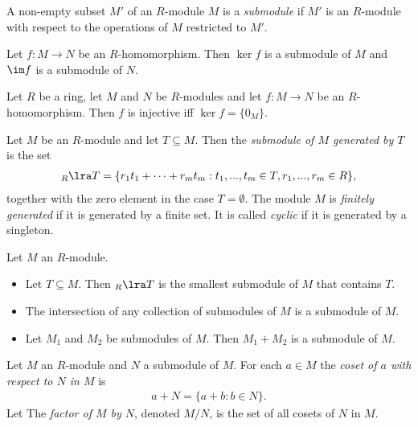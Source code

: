 \documentclass{article}
\begin{document}
\begin{definition}
    A non-empty subset $M'$ of an $R$-module $M$ is a \emph{submodule} if $M'$ is an 
    $R$-module with respect to the operations of $M$ restricted to $M'$.
\end{definition}

\begin{lemma}[Notes 3.7.21]
    Let $f:M\to N$ be an $R$-homomorphism. Then $\ker f$ is a submodule of $M$ and $\im f$
    is a submodule of $N$.
\end{lemma}

\begin{lemma}[Notes 3.7.22]
    Let $R$ be a ring, let $M$ and $N$ be $R$-modules and let $f:M\to N$ be an $R$-homomorphism.
    Then $f$ is injective iff $\ker f =\{0_M\}$. 
\end{lemma}

\begin{definition}
    Let $M$ be an $R$-module and let $T\subseteq M$. Then the \emph{submodule of $M$ generated by $T$}
    is the set 
    \begin{align*}
        _R\lra T = \{r_1t_1+\cdots+r_mt_m:t_1,...,t_m\in T,r_1,...,r_m\in R\},
    \end{align*}
    together with the zero element in the case $T=\emptyset$. The module $M$ is \emph{finitely generated}
    if it is generated by a finite set. It is called \emph{cyclic} if it is generated by a singleton.
\end{definition}

\begin{lemma}[Notes 3.7.28-30]
    Let $M$ an $R$-module. 
    \begin{itemize}
        \item Let $T\subseteq M$. Then $_R\lra T$ is the smallest submodule of $M$ that contains $T$.
        \item The intersection of any collection of submodules of $M$ is a submodule of $M$.
        \item Let $M_1$ and $M_2$ be submodules of $M$. Then $M_1+M_2$ is a submodule of $M$.
    \end{itemize}
\end{lemma}

\begin{definition}
    Let $M$ an $R$-module and $N$ a submodule of $M$. For each $a\in M$ the \emph{coset of $a$ with
    respect to $N$ in $M$} is 
    \begin{align*}
        a+N=\{a+b:b\in N\}.
    \end{align*} 
    Let 
    The \emph{factor of $M$ by $N$}, denoted $M/N$, is the set of all cosets of $N$ in $M$.
\end{definition}
\end{document}
